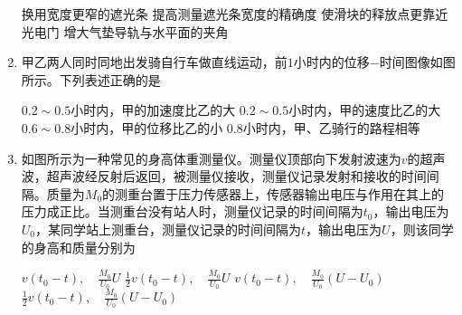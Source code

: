\begin{enumerate}[leftmargin=0em]
\fourchoices
{换用宽度更窄的遮光条}
{提高测量遮光条宽度的精确度}
{使滑块的释放点更靠近光电门}
{增大气垫导轨与水平面的夹角}

\item 
{}
甲乙两人同时同地出发骑自行车做直线运动，前$ 1 $小时内的位移$ - $时间图像如图所示。下列表述正确的是  
\begin{figure}[h!]
\centering

\end{figure}


\fourchoices
{$ 0.2 \sim 0.5 $小时内，甲的加速度比乙的大}
{$ 0.2 \sim 0.5 $小时内，甲的速度比乙的大}
{$ 0.6 \sim 0.8 $小时内，甲的位移比乙的小}
{$ 0.8 $小时内，甲、乙骑行的路程相等}


\item 
{}
如图所示为一种常见的身高体重测量仪。测量仪顶部向下发射波速为$ v $的超声波，超声波经反射后返回，被测量仪接收，测量仪记录发射和接收的时间间隔。质量为$ M_{0} $的测重台置于压力传感器上，传感器输出电压与作用在其上的压力成正比。当测重台没有站人时，测量仪记录的时间间隔为$ t_{0} $，输出电压为$ U_{0} $，某同学站上测重台，测量仪记录的时间间隔为$ t $，输出电压为$ U $，则该同学的身高和质量分别为  
\begin{figure}[h!]
\centering

\end{figure}


\fourchoices
{$ v \left( t _ { 0 } - t \right) , \quad \frac { M _ { 0 } } { U _ { 0 } } U $}
{$ \frac { 1 } { 2 } v \left( t _ { 0 } - t \right) , \quad \frac { M _ { 0 } } { U _ { 0 } } U $}
{$ v \left( t _ { 0 } - t \right) , \quad \frac { M _ { 0 } } { U _ { 0 } } \left( U - U _ { 0 } \right) $}
{$ \frac { 1 } { 2 } v \left( t _ { 0 } - t \right) , \quad \frac { M _ { 0 } } { U _ { 0 } } \left( U - U _ { 0 } \right) $}











\end{enumerate}




